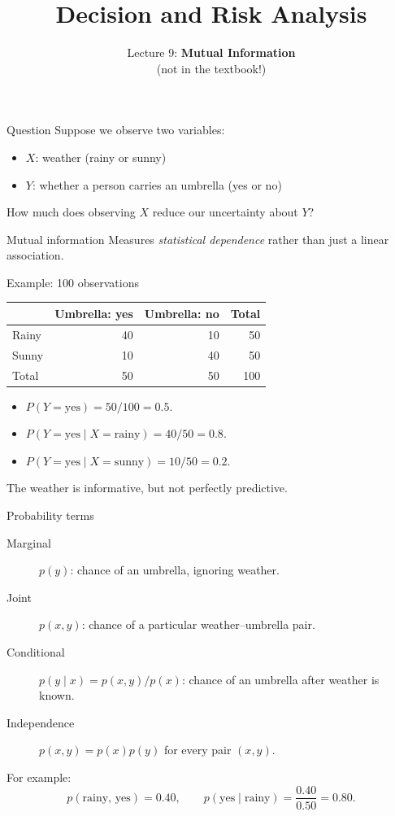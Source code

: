 \documentclass[aspectratio=43,11pt]{beamer}
\title{Decision and Risk Analysis}
\subtitle{Lecture 9: \textbf{Mutual Information\\}(not in the textbook!)}
\author{}
\date{\color{aggiemaroon}{DAEN 427 / ISEN 427 / ISEN 627 - Fall 2026\\
      \textbf{Alexander Abuabara}}}
\begin{document}
\begin{frame}
\titlepage
\end{frame}

\begin{frame}{Question}
Suppose we observe two variables:
\begin{itemize}
\item $X$: weather (rainy or sunny)
\item $Y$: whether a person carries an umbrella (yes or no)
\end{itemize}
\vspace{0.5em}
How much does observing $X$ reduce our uncertainty about $Y$?
\begin{block}{Mutual information}
Measures \emph{statistical dependence} rather than just a linear association.
\end{block}
\end{frame}

\begin{frame}{Example: 100 observations}
\centering
\begin{tabular}{lrrr}
\toprule
& Umbrella: yes & Umbrella: no & Total\\
\midrule
Rainy & 40 & 10 & 50\\
Sunny & 10 & 40 & 50\\
\midrule
Total & 50 & 50 & 100\\
\bottomrule
\end{tabular}
\vspace{1em}
\begin{itemize}
\item $P(Y=\text{yes})=50/100=0.5$.
\item $P(Y=\text{yes}\mid X=\text{rainy})=40/50=0.8$.
\item $P(Y=\text{yes}\mid X=\text{sunny})=10/50=0.2$.
\end{itemize}
\medskip
The weather is informative, but not perfectly predictive.
\end{frame}

\begin{frame}{Probability terms}
\begin{description}
\item[Marginal] $p(y)$: chance of an umbrella, ignoring weather.
\item[Joint] $p(x,y)$: chance of a particular weather--umbrella pair.
\item[Conditional] $p(y\mid x)=p(x,y)/p(x)$: chance of an umbrella after weather is known.
\item[Independence] $p(x,y)=p(x)p(y)$ for every pair $(x,y)$.
\end{description}
\medskip
For example:
\[
p(\text{rainy, yes})=0.40,\qquad
p(\text{yes}\mid\text{rainy})=\frac{0.40}{0.50}=0.80.
\]
\end{frame}
\end{document}
